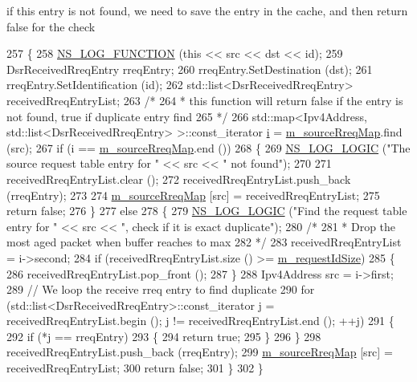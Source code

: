 if this entry is not found, we need to save the entry in the cache, and then return false for the check 
\begin{DoxyCode}
257 \{
258   \hyperlink{log-macros-disabled_8h_a90b90d5bad1f39cb1b64923ea94c0761}{NS\_LOG\_FUNCTION} (\textcolor{keyword}{this} << src << dst << \textcolor{keywordtype}{id});
259   DsrReceivedRreqEntry rreqEntry;
260   rreqEntry.SetDestination (dst);
261   rreqEntry.SetIdentification (\textcolor{keywordtype}{id});
262   std::list<DsrReceivedRreqEntry> receivedRreqEntryList;
263   \textcolor{comment}{/*}
264 \textcolor{comment}{   * this function will return false if the entry is not found, true if duplicate entry find}
265 \textcolor{comment}{   */}
266   std::map<Ipv4Address, std::list<DsrReceivedRreqEntry> >::const\_iterator \hyperlink{bernuolliDistribution_8m_a6f6ccfcf58b31cb6412107d9d5281426}{i} = 
      \hyperlink{classns3_1_1dsr_1_1DsrRreqTable_a27e14271b4bc6fb6d8cbd294f6a97bfb}{m\_sourceRreqMap}.find (src);
267   \textcolor{keywordflow}{if} (i == \hyperlink{classns3_1_1dsr_1_1DsrRreqTable_a27e14271b4bc6fb6d8cbd294f6a97bfb}{m\_sourceRreqMap}.end ())
268     \{
269       \hyperlink{group__logging_ga88acd260151caf2db9c0fc84997f45ce}{NS\_LOG\_LOGIC} (\textcolor{stringliteral}{"The source request table entry for "} << src << \textcolor{stringliteral}{" not found"});
270 
271       receivedRreqEntryList.clear ();  
272       receivedRreqEntryList.push\_back (rreqEntry);
273 
274       \hyperlink{classns3_1_1dsr_1_1DsrRreqTable_a27e14271b4bc6fb6d8cbd294f6a97bfb}{m\_sourceRreqMap} [src] = receivedRreqEntryList;
275       \textcolor{keywordflow}{return} \textcolor{keyword}{false};
276     \}
277   \textcolor{keywordflow}{else}
278     \{
279       \hyperlink{group__logging_ga88acd260151caf2db9c0fc84997f45ce}{NS\_LOG\_LOGIC} (\textcolor{stringliteral}{"Find the request table entry for  "} << src << \textcolor{stringliteral}{", check if it is exact
       duplicate"});
280       \textcolor{comment}{/*}
281 \textcolor{comment}{       * Drop the most aged packet when buffer reaches to max}
282 \textcolor{comment}{       */}
283       receivedRreqEntryList = i->second;
284       \textcolor{keywordflow}{if} (receivedRreqEntryList.size () >= \hyperlink{classns3_1_1dsr_1_1DsrRreqTable_abc5546adc8c2dd2b434f583a5c8299d9}{m\_requestIdSize})
285         \{
286           receivedRreqEntryList.pop\_front ();
287         \}
288       Ipv4Address src = i->first;
289       \textcolor{comment}{// We loop the receive rreq entry to find duplicate}
290       \textcolor{keywordflow}{for} (std::list<DsrReceivedRreqEntry>::const\_iterator j = receivedRreqEntryList.begin (); j != 
      receivedRreqEntryList.end (); ++j)
291         \{
292           \textcolor{keywordflow}{if} (*j == rreqEntry)          
293             \{
294               \textcolor{keywordflow}{return} \textcolor{keyword}{true};
295             \}
296         \}
298       receivedRreqEntryList.push\_back (rreqEntry);
299       \hyperlink{classns3_1_1dsr_1_1DsrRreqTable_a27e14271b4bc6fb6d8cbd294f6a97bfb}{m\_sourceRreqMap} [src] = receivedRreqEntryList;
300       \textcolor{keywordflow}{return} \textcolor{keyword}{false};
301     \}
302 \}
\end{DoxyCode}



